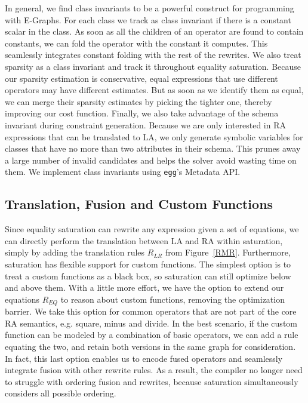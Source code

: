 In general, we find class invariants to be a powerful construct for programming
with E-Graphs. For each class we track as class invariant if there is a constant
scalar in the class. As soon as all the children of an operator are found to
contain constants, we can fold the operator with the constant it computes. This
seamlessly integrates constant folding with the rest of the rewrites. We also
treat sparsity as a class invariant and track it throughout equality saturation.
Because our sparsity estimation is conservative, equal expressions that use
different operators may have different estimates. But as soon as we identify
them as equal, we can merge their sparsity estimates by picking the tighter one,
thereby improving our cost function. Finally, we also take advantage of the
schema invariant during constraint generation. Because we are only interested in
RA expressions that can be translated to LA, we only generate symbolic variables
for classes that have no more than two attributes in their schema. This prunes
away a large number of invalid candidates and helps the solver avoid wasting
time on them. We implement class invariants using \texttt{egg}'s Metadata API.

\subsection{Translation, Fusion and Custom Functions}
\label{udfs}
Since equality saturation can rewrite any expression given a set of equations,
we can directly perform the translation between LA and RA within saturation,
simply by adding the translation rules $R_{LR}$ from Figure~\ref{RMR}.
Furthermore, saturation has flexible support for custom functions. The simplest
option is to treat a custom functions as a black box, so saturation can still
optimize below and above them. With a little more effort, we have the option to
extend our equations $R_{EQ}$ to reason about custom functions, removing the
optimization barrier. We take this option for common operators that are not part
of the core RA semantics, e.g. square, minus and divide. In the best scenario,
if the custom function can be modeled by a combination of basic operators, we
can add a rule equating the two, and retain both versions in the same graph for
consideration. In fact, this last option enables us to encode fused operators
and seamlessly integrate fusion with other rewrite rules. As a result, the
compiler no longer need to struggle with ordering fusion and rewrites, because
saturation simultaneously considers all possible ordering. 
 

